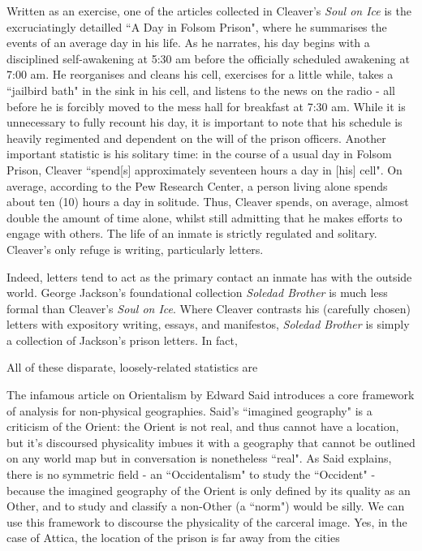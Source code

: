 \documentclass[14pt, letterpaper]{report}
\begin{document}
	Written as an exercise, one of the articles collected in Cleaver's 
	\textit{Soul on Ice} is the excruciatingly detailled ``A Day in Folsom
	Prison", where he summarises the events of an average day in his life. 
	As he narrates, his day begins with a disciplined self-awakening at 
	5:30 am before 
	the officially scheduled awakening at 7:00 am. He 
	reorganises and cleans his cell, exercises for a little while, 
	takes a ``jailbird bath" in the sink in his cell, and listens to 
	the news on the radio - all before he is forcibly moved to the mess hall 
	for breakfast at 7:30 am. \autocite[64]{soul-on-ice} While it is unnecessary 
	to fully recount his day, it is important to note that his schedule is 
	heavily regimented and dependent on the will of the prison officers. 
	Another important statistic is his solitary time: in the course of a 
	usual day in Folsom Prison, Cleaver ``spend[s] approximately seventeen 
	hours a day in [his] cell". On average, according to the Pew Research 
	Center, a person living alone spends about ten (10) hours a day in 
	solitude. \autocite{pew-alone} Thus, Cleaver spends, on average, almost 
	double the amount of time alone, whilst still admitting that he makes 
	efforts to engage with others. The life of an inmate is strictly regulated and 
	solitary. 	Cleaver's only refuge is writing, particularly letters. 
	
	Indeed, letters 	tend to act as the primary contact an inmate has with the 
	outside world. George Jackson's foundational collection \textit{Soledad Brother} 
	is much less formal than Cleaver's \textit{Soul on Ice}. Where Cleaver contrasts 
	his (carefully chosen) letters with expository writing, essays, and manifestos, 
	\textit{Soledad Brother} is simply a collection of Jackson's prison letters. 
	In fact, 
    
    All of these disparate, loosely-related statistics are 
    
    The infamous article on Orientalism by Edward Said \autocite{said-orientalism} 
    introduces a core framework of analysis for non-physical geographies. Said's 
    ``imagined geography" is a criticism of the Orient: the Orient is not real, 
    and thus cannot have a location, but it's discoursed physicality imbues it with 
    a geography that cannot be outlined on any world map but in conversation is 
    nonetheless ``real". As Said explains, there is no symmetric field - an ``Occidentalism" 
    to study the ``Occident" - because the imagined geography of the Orient is only 
    defined by its quality as an Other, and to study and classify a non-Other (a ``norm") 
    would be silly. \autocite[163]{said-orientalism} We can use this framework to 
    discourse the physicality of the carceral image. Yes, in the case of Attica, the 
    location of the prison is far away from the cities
	
\end{document}
